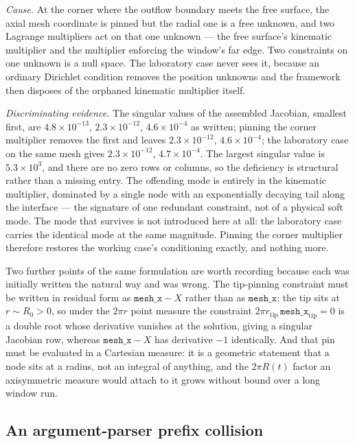 \documentclass[11pt,a4paper]{article}
\begin{document}
\emph{Cause.} At the corner where the outflow boundary meets the free surface,
the axial mesh coordinate is pinned but the radial one is a free unknown, and
two Lagrange multipliers act on that one unknown --- the free surface's
kinematic multiplier and the multiplier enforcing the window's far edge. Two
constraints on one unknown is a null space. The laboratory case never sees it,
because an ordinary Dirichlet condition removes the position unknowns and the
framework then disposes of the orphaned kinematic multiplier itself.

\emph{Discriminating evidence.} The singular values of the assembled Jacobian,
smallest first, are $4.8\times10^{-13}$, $2.3\times10^{-12}$,
$4.6\times10^{-4}$ as written; pinning the corner multiplier removes the first
and leaves $2.3\times10^{-12}$, $4.6\times10^{-4}$; the laboratory case on the
same mesh gives $2.3\times10^{-12}$, $4.7\times10^{-4}$. The largest singular
value is $5.3\times10^{3}$, and there are no zero rows or columns, so the
deficiency is structural rather than a missing entry. The offending mode is
entirely in the kinematic multiplier, dominated by a single node with an
exponentially decaying tail along the interface --- the signature of one
redundant constraint, not of a physical soft mode. The mode that survives is not
introduced here at all: the laboratory case carries the identical mode at the
same magnitude. Pinning the corner multiplier therefore restores the working
case's conditioning exactly, and nothing more.

Two further points of the same formulation are worth recording because each was
initially written the natural way and was wrong. The tip-pinning constraint must
be written in residual form as $\texttt{mesh\_x} - X$ rather than as
$\texttt{mesh\_x}$: the tip sits at $r\sim R_{0}>0$, so under the $2\pi r$ point
measure the constraint $2\pi r_{\mathrm{tip}}\,\texttt{mesh\_x}_{\mathrm{tip}} =
0$ is a double root whose derivative vanishes at the solution, giving a singular
Jacobian row, whereas $\texttt{mesh\_x} - X$ has derivative $-1$ identically.
And that pin must be evaluated in a Cartesian measure: it is a geometric
statement that a node sits at a radius, not an integral of anything, and the
$2\pi R(t)$ factor an axisymmetric measure would attach to it grows without
bound over a long window run.

\subsection{An argument-parser prefix collision}
\label{sec:trap-argv}
\end{document}
